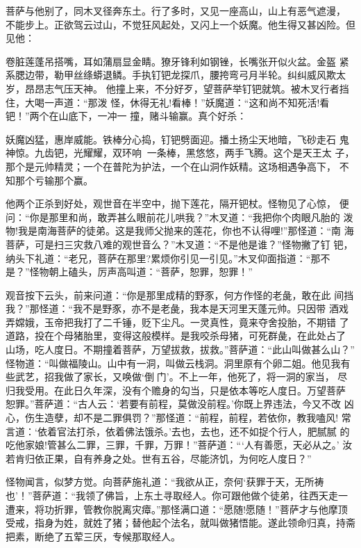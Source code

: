 菩萨与他别了，同木叉径奔东土。行了多时，又见一座高山，山上有恶气遮漫，
不能步上。正欲驾云过山，不觉狂风起处，又闪上一个妖魔。他生得又甚凶险。但
见他：

卷脏莲蓬吊搭嘴，耳如蒲扇显金睛。獠牙锋利如钢锉，长嘴张开似火盆。金盔
紧系腮边带，勒甲丝绦蟒退鳞。手执钉钯龙探爪，腰挎弯弓月半轮。纠纠威风欺太
岁，昂昂志气压天神。
他撞上来，不分好歹，望菩萨举钉钯就筑。被木叉行者挡住，大喝一声道：“那泼
怪，休得无礼!看棒！”妖魔道：“这和尚不知死活!看钯！”两个在山底下，一冲一
撞，赌斗输赢。真个好杀：

妖魔凶猛，惠岸威能。铁棒分心捣，钉钯劈面迎。播土扬尘天地暗，飞砂走石
鬼神惊。九齿钯，光耀耀，双环响；一条棒，黑悠悠，两手飞腾。这个是天王太
子，那个是元帅精灵；一个在普陀为护法，一个在山洞作妖精。这场相遇争高下，
不知那个亏输那个赢。

他两个正杀到好处，观世音在半空中，抛下莲花，隔开钯杖。怪物见了心惊，
便问：“你是那里和尚，敢弄甚么眼前花儿哄我？”木叉道：“我把你个肉眼凡胎的
泼物!我是南海菩萨的徒弟。这是我师父抛来的莲花，你也不认得哩!”那怪道：“南
海菩萨，可是扫三灾救八难的观世音么？”木叉道：“不是他是谁？”怪物撇了钉
钯，纳头下礼道：“老兄，菩萨在那里?累烦你引见一引见。”木叉仰面指道：“那不
是？”怪物朝上磕头，厉声高叫道：“菩萨，恕罪，恕罪！”

观音按下云头，前来问道：“你是那里成精的野豕，何方作怪的老彘，敢在此
间挡我？”那怪道：“我不是野豕，亦不是老彘，我本是天河里天蓬元帅。只因带
酒戏弄嫦娥，玉帝把我打了二千锤，贬下尘凡。一灵真性，竟来夺舍投胎，不期错
了道路，投在个母猪胎里，变得这般模样。是我咬杀母猪，可死群彘，在此处占了
山场，吃人度日。不期撞着菩萨，万望拔救，拔救。”菩萨道：“此山叫做甚么山？”
怪物道：“叫做福陵山。山中有一洞，叫做云栈洞。洞里原有个卵二姐。他见我有
些武艺，招我做了家长，又唤做‘倒门’。不上一年，他死了，将一洞的家当，
尽归我受用。在此日久年深，没有个赡身的勾当，只是依本等吃人度日。万望菩萨
恕罪。”菩萨道：“古人云：‘若要有前程，莫做没前程。’你既上界违法，今又不改
凶心，伤生造孽，却不是二罪俱罚？”那怪道：“前程，前程，若依你，教我嗑风!
常言道：‘依着官法打杀，依着佛法饿杀。’去也，去也，还不如捉个行人，肥腻腻
的吃他家娘!管甚么二罪，三罪，千罪，万罪！”菩萨道：“‘人有善愿，天必从之。’
汝若肯归依正果，自有养身之处。世有五谷，尽能济饥，为何吃人度日？”

怪物闻言，似梦方觉。向菩萨施礼道：“我欲从正，奈何‘获罪于天，无所祷
也’！”菩萨道：“我领了佛旨，上东土寻取经人。你可跟他做个徒弟，往西天走一
遭来，将功折罪，管教你脱离灾瘴。”那怪满口道：“愿随!愿随！”菩萨才与他摩顶
受戒，指身为姓，就姓了猪；替他起个法名，就叫做猪悟能。遂此领命归真，持斋
把素，断绝了五荤三厌，专候那取经人。


